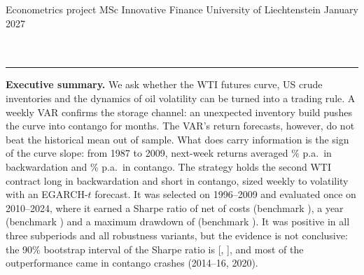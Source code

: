 \documentclass[10pt,a4paper]{article}
\begin{document}
\thispagestyle{plain}
\begin{flushleft}
{\sffamily\scriptsize\color{muted} Econometrics project \textbullet{} MSc Innovative Finance \textbullet{} University of Liechtenstein \textbullet{} January 2027}\\[4pt]
{\sffamily\bfseries\LARGE \ProjectTitle}\\[2pt]
{\sffamily\large \ProjectSubtitle}\\[5pt]
{\small \TeamName{} \textbullet{} \TeamMembers}
\end{flushleft}
\vspace{-2pt}
{\color{rulegrey}\hrule}
\vspace{6pt}

\noindent\colorbox{panel}{\begin{minipage}{\dimexpr\linewidth-2\fboxsep}
\small\textsf{\textbf{Executive summary.}}
We ask whether the WTI futures curve, US crude inventories and the dynamics of oil volatility can be turned into a trading rule. A weekly VAR confirms the storage channel: an unexpected inventory build pushes the curve into contango for months. The VAR's return forecasts, however, do not beat the historical mean out of sample. What does carry information is the sign of the curve slope: from 1987 to 2009, next-week returns averaged \NBackAnn\% p.a.\ in backwardation and \NContAnn\% p.a.\ in contango. The strategy holds the second WTI contract long in backwardation and short in contango, sized weekly to \NTargetVol{} volatility with an EGARCH-$t$ forecast. It was selected on 1996--2009 and evaluated once on 2010--2024, where it earned a Sharpe ratio of \NOosSharpeMain{} net of costs (benchmark \NOosSharpeBench), \NOosCagrMain{} a year (benchmark \NOosCagrBench) and a maximum drawdown of \NOosMddMain{} (benchmark \NOosMddBench). It was positive in all three subperiods and all \NRobN{} robustness variants, but the evidence is not conclusive: the 90\% bootstrap interval of the Sharpe ratio is [\NBootLo, \NBootHi], and most of the outperformance came in contango crashes (2014--16, 2020).
\end{minipage}}
\end{document}
